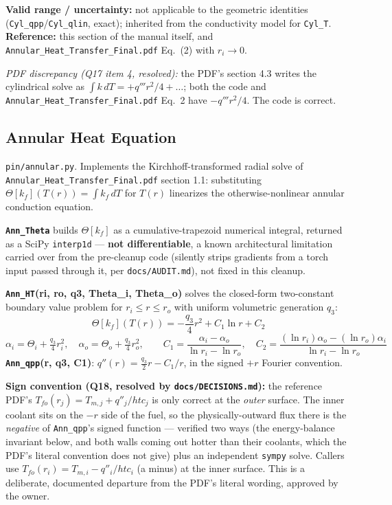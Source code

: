 \documentclass[11pt]{article}
\newcommand{\code}[1]{\texttt{#1}}
\begin{document}
\textbf{Valid range / uncertainty:} not applicable to the geometric identities
(\code{Cyl\_qpp}/\code{Cyl\_qlin}, exact); inherited from the conductivity model for
\code{Cyl\_T}. \textbf{Reference:} this section of the manual itself, and
\code{Annular\_Heat\_Transfer\_Final.pdf} Eq.\ (2) with $r_i\to0$.

\textit{PDF discrepancy (Q17 item 4, resolved):} the PDF's section 4.3 writes the
cylindrical solve as $\int k\,dT = +q'''r^2/4+\ldots$; both the code and
\code{Annular\_Heat\_Transfer\_Final.pdf} Eq.\ 2 have $-q'''r^2/4$. The code is correct.

\subsection{Annular Heat Equation}

\code{pin/annular.py}. Implements the Kirchhoff-transformed radial solve of
\code{Annular\_Heat\_Transfer\_Final.pdf} section 1.1: substituting
$\Theta[k_f](T(r))=\int k_f\,dT$ for $T(r)$ linearizes the otherwise-nonlinear annular
conduction equation.

\textbf{\code{Ann\_Theta}} builds $\Theta[k_f]$ as a cumulative-trapezoid numerical
integral, returned as a SciPy \code{interp1d} --- \textbf{not differentiable}, a known
architectural limitation carried over from the pre-cleanup code (silently strips
gradients from a torch input passed through it, per \code{docs/AUDIT.md}), not fixed in
this cleanup.

\textbf{\code{Ann\_HT}(ri, ro, q3, Theta\_i, Theta\_o)} solves the closed-form
two-constant boundary value problem for $r_i\le r\le r_o$ with uniform volumetric
generation $q_3$:
\[
  \Theta[k_f](T(r)) = -\frac{q_3}{4}r^2 + C_1\ln r + C_2
\]
\[
  \alpha_i=\Theta_i+\tfrac{q_3}{4}r_i^2,\quad \alpha_o=\Theta_o+\tfrac{q_3}{4}r_o^2,
  \qquad C_1=\frac{\alpha_i-\alpha_o}{\ln r_i-\ln r_o},\quad
  C_2=\frac{(\ln r_i)\alpha_o-(\ln r_o)\alpha_i}{\ln r_i-\ln r_o}
\]
\textbf{\code{Ann\_qpp}(r, q3, C1)}: $q''(r)=\tfrac{q_3}{2}r - C_1/r$, in the signed
$+r$ Fourier convention.

\textbf{Sign convention (Q18, resolved by \code{docs/DECISIONS.md}):} the reference
PDF's $T_{fo}(r_j)=T_{m,j}+q''_j/htc_j$ is only correct at the \emph{outer} surface. The
inner coolant sits on the $-r$ side of the fuel, so the physically-outward flux there is
the \emph{negative} of \code{Ann\_qpp}'s signed function --- verified two ways (the
energy-balance invariant below, and both walls coming out hotter than their coolants,
which the PDF's literal convention does not give) plus an independent \code{sympy}
solve. Callers use $T_{fo}(r_i) = T_{m,i} - q''_i/htc_i$ (a minus) at the inner surface.
This is a deliberate, documented departure from the PDF's literal wording, approved by
the owner.
\end{document}
